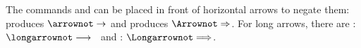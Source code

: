 \medskip
\bigskip
\filbreak
{}

\medskip
\bigskip
\noindent The commands {\cmd\arrownot} and {\cmd\Arrownot}
can be placed in front of horizontal arrows to negate them:
{\cmd\arrownot\cmd\rightarrow} produces
        $\arrownot\rightarrow$ and
        {\cmd\Arrownot\cmd\Rightarrow} produces
        $\Arrownot\Rightarrow$.
For long arrows, there are {\cmd\longarrownot}{\cmd\longrightarrow}:
$\longarrownot\longrightarrow$ \ and {\cmd\Longarrownot}{\cmd\Longrightarrow}:
                                $\Longarrownot\Longrightarrow$.
\medskip
\bigskip
\filbreak
{}

\medskip
\bigskip
\filbreak
{}

\medskip
\bigskip
\filbreak
{}

